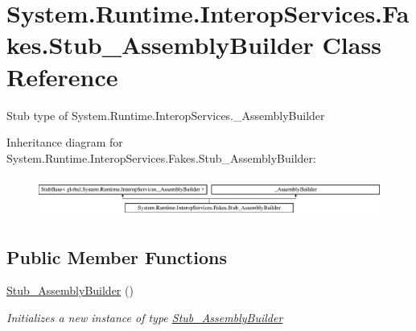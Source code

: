 \hypertarget{class_system_1_1_runtime_1_1_interop_services_1_1_fakes_1_1_stub___assembly_builder}{\section{System.\-Runtime.\-Interop\-Services.\-Fakes.\-Stub\-\_\-\-Assembly\-Builder Class Reference}
\label{class_system_1_1_runtime_1_1_interop_services_1_1_fakes_1_1_stub___assembly_builder}
}


Stub type of System.\-Runtime.\-Interop\-Services.\-\_\-\-Assembly\-Builder 


Inheritance diagram for System.\-Runtime.\-Interop\-Services.\-Fakes.\-Stub\-\_\-\-Assembly\-Builder\-:\begin{figure}[H]
\begin{center}
\leavevmode
\includegraphics[height=1.330166cm]{class_system_1_1_runtime_1_1_interop_services_1_1_fakes_1_1_stub___assembly_builder}
\end{center}
\end{figure}
\subsection*{Public Member Functions}
\begin{DoxyCompactItemize}
\item 
\hyperlink{class_system_1_1_runtime_1_1_interop_services_1_1_fakes_1_1_stub___assembly_builder_ad4b65e5ad482c0abca5200dea2622465}{Stub\-\_\-\-Assembly\-Builder} ()
\begin{DoxyCompactList}\small\item\em Initializes a new instance of type \hyperlink{class_system_1_1_runtime_1_1_interop_services_1_1_fakes_1_1_stub___assembly_builder}{Stub\-\_\-\-Assembly\-Builder}\end{DoxyCompactList}\end{DoxyCompactItemize}
